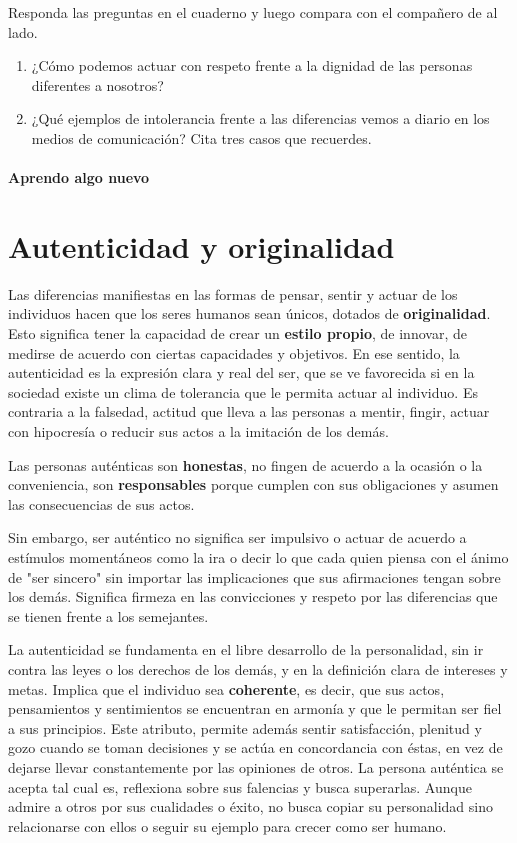 \documentclass[10pt,twoside]{article}
\begin{document}
Responda las preguntas en el cuaderno y luego compara con el compañero de al lado.
\begin{enumerate}
\item ¿Cómo podemos actuar con respeto frente a la dignidad de
las personas diferentes a nosotros?
\item ¿Qué ejemplos de intolerancia frente a las diferencias vemos a diario en los medios de comunicación? Cita tres casos que recuerdes.
\end{enumerate}
\paragraph*{Aprendo algo nuevo}
\section*{Autenticidad y originalidad}
Las diferencias manifiestas en las formas de pensar, sentir
y actuar de los individuos hacen que los seres humanos
sean únicos, dotados de \textbf{originalidad}. Esto significa tener la capacidad de crear un \textbf{estilo propio}, de innovar, de medirse de acuerdo con ciertas capacidades y objetivos. En ese sentido, la autenticidad es la expresión clara y real del ser, que se ve favorecida si en la sociedad existe un clima de tolerancia que le permita actuar al individuo. Es contraria a la falsedad, actitud que lleva a las personas a mentir, fingir, actuar con hipocresía o reducir sus actos a la imitación de los demás.

Las personas auténticas son \textbf{honestas}, no fingen de acuerdo a la ocasión o la conveniencia, son \textbf{responsables} porque cumplen con sus obligaciones y asumen las consecuencias de sus actos.

Sin embargo, ser auténtico no significa ser impulsivo o
actuar de acuerdo a estímulos momentáneos como la ira o
decir lo que cada quien piensa con el ánimo de "ser sincero" sin importar las implicaciones que sus afirmaciones tengan sobre los demás. Significa firmeza en las convicciones y respeto por las diferencias que se tienen frente a los semejantes.

La autenticidad se fundamenta en el libre desarrollo de la
personalidad, sin ir contra las leyes o los derechos de los
demás, y en la definición clara de intereses y metas. Implica
que el individuo sea \textbf{coherente}, es decir, que sus actos, pensamientos y sentimientos se encuentran en armonía y
que le permitan ser fiel a sus principios. Este atributo, permite además sentir satisfacción, plenitud y gozo cuando se toman decisiones y se actúa en concordancia con éstas, en vez de dejarse llevar constantemente por las opiniones de otros.
La persona auténtica se acepta tal cual es, reflexiona sobre
sus falencias y busca superarlas. Aunque admire a otros por
sus cualidades o éxito, no busca copiar su personalidad sino
relacionarse con ellos o seguir su ejemplo para crecer como
ser humano.
\end{document}

